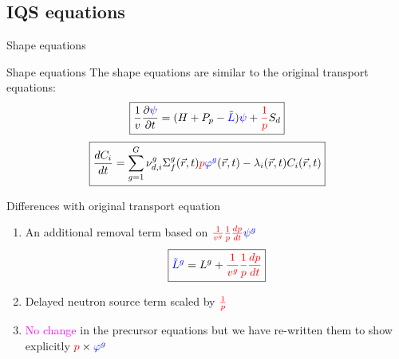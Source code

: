 \documentclass[8pt]{beamer}
\renewcommand{\div}{\vec{\nabla}\! \cdot \!}
\newcommand{\grad}{\vec{\nabla}}
\newcommand{\be}{\begin{equation}}
\newcommand{\ee}{\end{equation}}
\newcommand{\ben}{\begin{enumerate}}
\newcommand{\een}{\end{enumerate}}
\newcommand{\keff}{\ensuremath{k_{\textit{eff}}}}
\newcommand{\tcr}[1]{\textcolor{red}{#1}}
\newcommand{\tcb}[1]{\textcolor{blue}{#1}}
\newcommand{\tcm}[1]{\textcolor{magenta}{#1}}
\begin{document}
\subsection{IQS equations}

\begin{frame}{Shape equations}

\begin{block}{Shape equations}
The shape equations are similar to the original transport equations:
\begin{equation*}
\boxed{
\frac{1}{v}\frac{\partial \tcb{\psi} }{\partial t} = (H + P_p - \tcb{\tilde{L}}) \tcb{\psi}  + \tcr{\frac{1}{p}} S_{d} 
}
\end{equation*}
\begin{equation*}
\boxed{
\frac{dC_i}{dt} = \sum_{g=1}^G \nu_{d,i}^{g} \Sigma_f^g(\vec{r},t) \tcr{p} \tcb{\varphi^{g}}(\vec{r},t) - \lambda_i(\vec{r},t) C_i(\vec{r},t) 
}
\end{equation*}
\end{block}

\begin{block}{Differences with original transport equation}
\ben
\item An additional removal term based on $\tcr{\frac{1}{v^g}\frac{1}{p}\frac{dp}{dt}} \tcb{\psi^g}$
\vspace{-3mm}
\begin{equation*}
\boxed{
\tcb{\tilde{L}^g} = L^g + \tcr{\frac{1}{v^g}\frac{1}{p}\frac{dp}{dt}} 
}
\end{equation*}
\vspace{-3mm}
\item Delayed neutron source term scaled by $\tcr{\frac{1}{p}}$
\item \tcm{No change} in the precursor equations but we have re-written them to show explicitly  $\tcr{p} \times \tcb{\varphi^{g}}$
\een
\end{block}

\end{frame}
\end{document}
